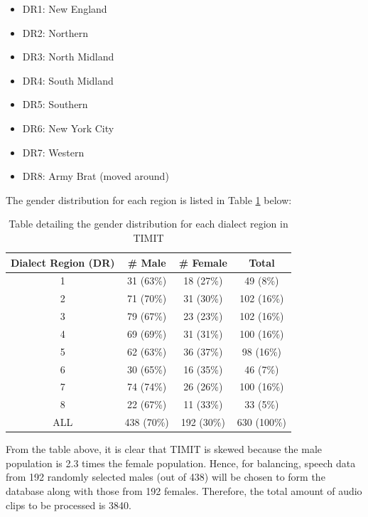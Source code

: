 \documentclass[11pt]{article}  %
\begin{document}
\begin{itemize}
	\item DR1: New England
	\item DR2: Northern
	\item DR3: North Midland
	\item DR4: South Midland
	\item DR5: Southern
	\item DR6: New York City
	\item DR7: Western
	\item DR8: Army Brat (moved around)
\end{itemize}

The gender distribution for each region is listed in Table \ref{table1} below:

\begin{table}[htbp]
	\begin{center}
		\begin{tabular}{|c|c|c|c|}
			\hline
			\textbf{Dialect Region (DR)}&\textbf{\# Male}&\textbf{\# Female}&\textbf{Total} \\
			\hline
			1 & 31 (63\%) & 18 (27\%) & 49 (8\%) \\
			\hline
			2 & 71 (70\%) & 31 (30\%) & 102 (16\%) \\
			\hline
			3 & 79 (67\%) & 23 (23\%) & 102 (16\%) \\
			\hline
			4 & 69 (69\%) & 31 (31\%) & 100 (16\%) \\
			\hline
			5 & 62 (63\%) & 36 (37\%) & 98 (16\%) \\
			\hline
			6 & 30 (65\%) & 16 (35\%) & 46 (7\%) \\
			\hline
			7 & 74 (74\%) & 26 (26\%) & 100 (16\%) \\
			\hline
			8 & 22 (67\%) & 11 (33\%) & 33 (5\%) \\
			\hline
			\rowcolor{LightCyan}
			ALL & 438 (70\%) & 192 (30\%) & 630 (100\%) \\
			\hline
		\end{tabular}
		\caption{Table detailing the gender distribution for each dialect region in TIMIT}
		\label{table1}
	\end{center}
\end{table}

From the table above, it is clear that TIMIT is skewed because the male population is 2.3 times the female population. Hence, for balancing, speech data from 192 randomly selected males (out of 438) will be chosen to form the database along with those from 192 females. Therefore, the total amount of audio clips to be processed is 3840.
\end{document}
